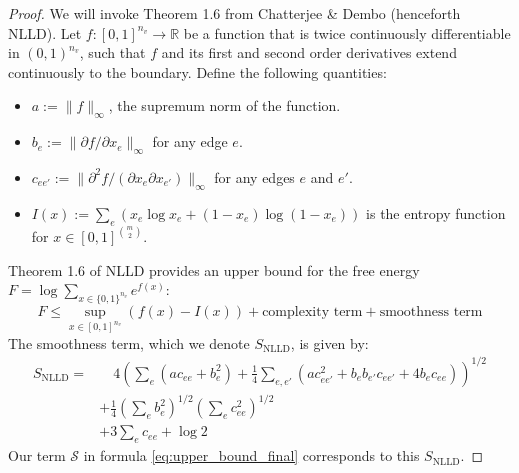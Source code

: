 \documentclass[12pt]{article}
\numberwithin{equation}{section}
\begin{document}
\begin{proof}

We will invoke Theorem 1.6 from Chatterjee \& Dembo \cite{chatterjee2016nonlinear} (henceforth NLLD). Let $f: [0,1]^{n_v} \to \mathbb{R}$ be a function that is twice continuously differentiable in $(0,1)^{n_v}$, such that $f$ and its first and second order derivatives extend continuously to the boundary. Define the following quantities:
\begin{itemize}
    \item $a := \|f\|_\infty$, the supremum norm of the function.
    \item $b_e := \|\partial f / \partial x_e\|_\infty$ for any edge $e$.
    \item $c_{ee'} := \|\partial^2 f / (\partial x_e \partial x_{e'})\|_\infty$ for any edges $e$ and $e'$.
    \item $I(x) := \sum_{e}^{} (x_e \log x_e + (1-x_e)\log(1-x_e))$ is the entropy function for $x \in [0,1]^{{m \choose 2}}$.
\end{itemize}
Theorem 1.6 of NLLD provides an upper bound for the free energy $F = \log \sum_{x \in \{0,1\}^{n_v}} e^{f(x)}$:
\begin{equation}
F \le \sup_{x \in [0,1]^{n_v}} (f(x) - I(x)) + \text{complexity term} + \text{smoothness term}
\end{equation}
The smoothness term, which we denote $S_{\text{NLLD}}$, is given by:
\begin{align*}
    S_{\text{NLLD}} = & \quad 4 \left( \sum_{e}^{} (ac_{ee} + b_e^2) + \frac{1}{4} \sum_{e,e'}^{} (ac_{ee'}^2 + b_e b_{e'} c_{ee'} + 4b_e c_{ee}) \right)^{1/2} \tag{$S_1$}\\
    & + \frac{1}{4} \left( \sum_{e}^{} b_e^2 \right)^{1/2} \left( \sum_{e}^{} c_{ee}^2 \right)^{1/2} \tag{$S_2$} \\
    & + 3 \sum_{e}^{} c_{ee} + \log 2 \tag{$S_3$}
\end{align*}
Our term $\mathcal{S}$ in formula \eqref{eq:upper_bound_final} corresponds to this $S_{\text{NLLD}}$.



\end{proof}
\end{document}
